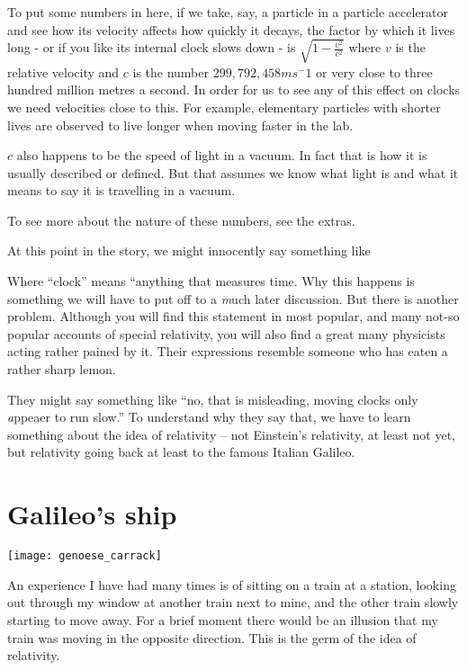 \documentclass[a4paper]{report}
\begin{document}
To put some numbers in here, if we take, say, a particle in a particle accelerator and see how its velocity affects how quickly it decays, the factor by which it lives long - or if you like its internal clock slows down - is $\sqrt{1 - \frac{v^2}{c^2}}$ where $v$ is the relative velocity and $c$ is the number $299,792,458ms^-1$ or very close to three hundred million metres a second. In order for us to see any of this effect on clocks we need velocities close to this. For example, elementary particles with shorter lives are observed to live longer when moving faster in the lab.

$c$ also happens to be the speed of light in a vacuum. In fact that is how it is usually described or defined. But that assumes we know what light is and what it means to say it is travelling in a vacuum. 

To see more about the nature of these numbers, see the extras.


At this point in the story, we might innocently say something like


Where ``clock'' means ``anything that measures time. Why this happens is something we will have to put off to a {\emph much later} discussion. But there is another problem. Although you will find this statement in most popular, and many not-so popular accounts of special relativity, you will also find a great many physicists acting rather pained by it. Their expressions resemble someone who has eaten a rather sharp lemon.

They might say something like ``no, that is misleading, moving clocks only {\emph appeaer} to run slow.'' To understand why they say that, we have to learn something about the idea of relativity -- not Einstein's relativity, at least not yet, but relativity going back at least to the famous Italian Galileo.

\section*{Galileo's ship}
\texttt{[image: genoese\_carrack]}

An experience I have had many times is of sitting on a train at a station, looking out through my window at another train next to mine, and the other train slowly starting to move away. For a brief moment there would be an illusion that my train was moving in the opposite direction. This is the germ of the idea of relativity.
\end{document}
